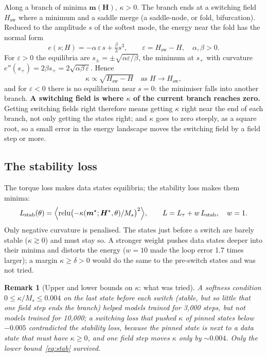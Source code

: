\documentclass[11pt,a4paper]{article}
\newcommand{\m}{\bm{m}}
\newcommand{\Hext}{\bm{H}}
\newtheorem*{remark}{Remark}
\begin{document}
Along a branch of minima $\m(\Hext)$, $\kappa>0$. The branch ends at a switching field $H_\mathrm{sw}$
where a minimum and a saddle merge (a saddle-node, or fold, bifurcation). Reduced to the amplitude $s$
of the softest mode, the energy near the fold has the normal form
\begin{equation}
  e(s;H) = -\alpha\,\varepsilon\, s + \tfrac{\beta}{3}s^3,\qquad \varepsilon = H_\mathrm{sw}-H,
  \quad \alpha,\beta>0 .
\end{equation}
For $\varepsilon>0$ the equilibria are $s_\pm=\pm\sqrt{\alpha\varepsilon/\beta}$, the minimum at $s_+$
with curvature $e''(s_+)=2\beta s_+ = 2\sqrt{\alpha\beta\,\varepsilon}$. Hence
\begin{equation}
  \kappa \propto \sqrt{H_\mathrm{sw}-H} \quad\text{as } H\to H_\mathrm{sw},
\end{equation}
and for $\varepsilon<0$ there is no equilibrium near $s=0$: the minimiser falls into another branch.
\textbf{A switching field is where $\kappa$ of the current branch reaches zero.} Getting switching
fields right therefore means getting $\kappa$ right near the end of each branch, not only getting the
states right; and $\kappa$ goes to zero steeply, as a square root, so a small error in the energy
landscape moves the switching field by a field step or more.

\subsection{The stability loss}

The torque loss makes data states equilibria; the stability loss makes them minima:
\begin{equation}
  L_\mathrm{stab}(\theta) = \Bigl\langle \operatorname{relu}\bigl(-\kappa(\m^\star;\Hext^\star,\theta)/M_s\bigr)^2 \Bigr\rangle,
  \qquad
  L = L_\tau + w\,L_\mathrm{stab}, \quad w=1 .
  \label{eq:stab}
\end{equation}
Only negative curvature is penalised. The states just before a switch are barely stable
($\kappa\gtrsim0$) and must stay so. A stronger weight pushes data states deeper into their minima and
distorts the energy ($w=10$ made the loop error 1.7 times larger); a margin $\kappa\ge\delta>0$ would
do the same to the pre-switch states and was not tried.

\begin{remark}[Upper and lower bounds on $\kappa$: what was tried]
A \emph{softness} condition $0\le\kappa/M_s\le0.004$ on the last state before each switch (stable, but
so little that one field step ends the branch) helped models trained for 3{,}000 steps, but not models
trained for 10{,}000; a \emph{switching} loss that pushed $\kappa$ of pinned states below $-0.005$
contradicted the stability loss, because the pinned state is next to a data state that must have
$\kappa\ge0$, and one field step moves $\kappa$ only by $\sim0.004$. Only the lower bound~\eqref{eq:stab}
survived.
\end{remark}
\end{document}
